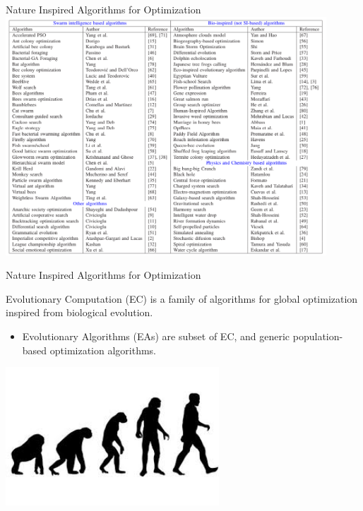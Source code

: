 \begin{frame}[c]{Nature Inspired Algorithms for Optimization }
\centering
\includegraphics[width=0.9\textwidth]{new_images/nature-inspired-algs.png}
\end{frame}

\begin{frame}[c]{Nature Inspired Algorithms for Optimization}
\begin{block}{Evolutionary Computation (EC)}
is a family of algorithms for global optimization inspired from biological evolution.
\begin{itemize}
    \item Evolutionary Algorithms (EAs) are subset of EC, and generic population-based optimization algorithms.
\end{itemize}
 
\end{block}
\centering
\includegraphics[width=0.6\textwidth]{new_images/EAs0.jpeg}
\end{frame}

